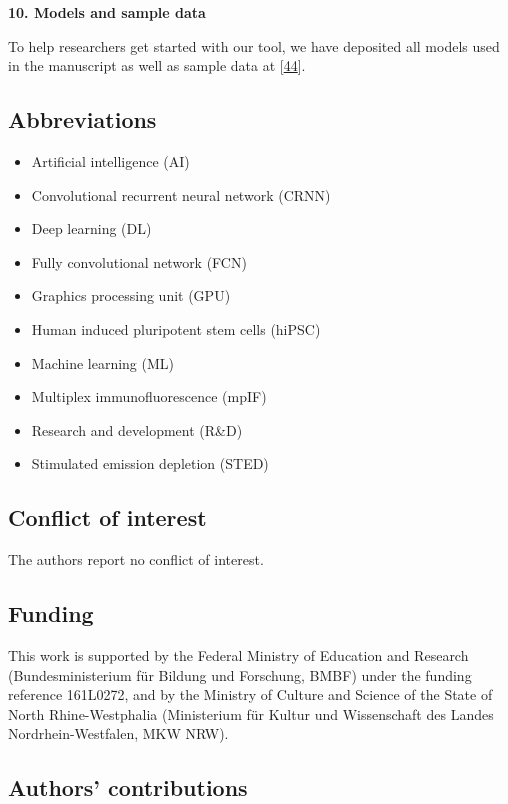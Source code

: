 \textbf{10. Models and sample data}

To help researchers get started with our tool, we have deposited all models used in the manuscript as well as sample data at {[}\protect\hyperlink{ref-FBoj3fXM}{44}{]}.

\hypertarget{abbreviations}{%
\subsection{Abbreviations}\label{abbreviations}}

\begin{itemize}
\tightlist
\item
  Artificial intelligence (AI)
\item
  Convolutional recurrent neural network (CRNN)
\item
  Deep learning (DL)
\item
  Fully convolutional network (FCN)
\item
  Graphics processing unit (GPU)
\item
  Human induced pluripotent stem cells (hiPSC)
\item
  Machine learning (ML)
\item
  Multiplex immunofluorescence (mpIF)
\item
  Research and development (R\&D)
\item
  Stimulated emission depletion (STED)
\end{itemize}

\hypertarget{conflict-of-interest}{%
\subsection{Conflict of interest}\label{conflict-of-interest}}

The authors report no conflict of interest.

\hypertarget{funding}{%
\subsection{Funding}\label{funding}}

This work is supported by the Federal Ministry of Education and Research (Bundesministerium für Bildung und Forschung, BMBF) under the funding reference 161L0272, and by the Ministry of Culture and Science of the State of North Rhine-Westphalia (Ministerium für Kultur und Wissenschaft des Landes Nordrhein-Westfalen, MKW NRW).

\hypertarget{authors-contributions}{%
\subsection{Authors' contributions}\label{authors-contributions}}

